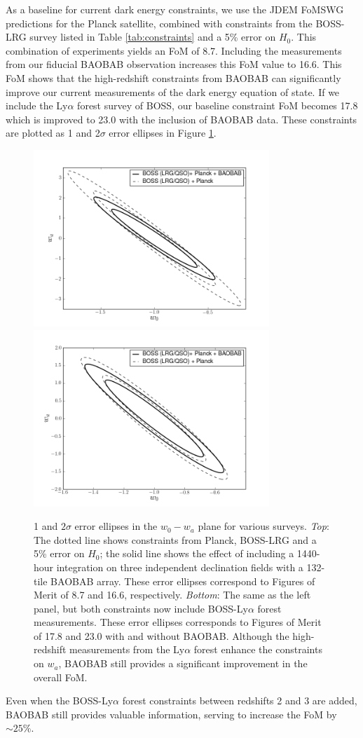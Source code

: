 \documentclass[10pt,iop]{emulateapj}
\begin{document}
As a baseline for current dark energy constraints,
we use the JDEM FoMSWG predictions for the Planck satellite, combined with constraints from the 
BOSS-LRG survey listed in Table \ref{tab:constraints} and a 5\% error on $H_0$.  
This combination of experiments yields an FoM
of 8.7.  Including the measurements from our fiducial BAOBAB observation increases this
FoM value to 16.6.  This FoM
shows that the high-redshift constraints from BAOBAB can significantly improve our current
measurements of the dark energy equation of state.  If we include the Ly$\alpha$ forest
survey of BOSS, our baseline constraint FoM becomes 17.8 which is improved to 23.0 with the inclusion
of BAOBAB data.  These constraints are plotted as 1 and 2$\sigma$ error ellipses in Figure
\ref{fig:fish}.  
\begin{figure}\centering
\includegraphics[width=3.5in]{fishmat_nolya.png}
\includegraphics[width=3.5in]{fishmat_lya.png}
\caption{1 and $2\sigma$ error ellipses in the $w_0-w_a$ plane for various surveys.  \emph{Top}: The dotted line shows constraints from Planck, BOSS-LRG and a 5\% error on $H_0$; the solid line shows the effect of including a 1440-hour integration on three independent declination fields with a 132-tile BAOBAB array.  These error ellipses correspond to Figures of Merit of 8.7 and 16.6, respectively.  \emph{Bottom}: The same as the left panel, but both constraints now include BOSS-Ly$\alpha$ forest measurements.  These error ellipses corresponds to Figures of Merit of 17.8 and 23.0 with and without BAOBAB.  Although the high-redshift measurements from the Ly$\alpha$ forest enhance the constraints on $w_a$, BAOBAB still provides a significant improvement in the overall FoM.}
\label{fig:fish}
\end{figure}
Even when the BOSS-Ly$\alpha$ forest constraints between redshifts 2 and 3 are 
added, BAOBAB still provides valuable information, serving to increase the FoM by $\sim 25\%$.
\end{document}
